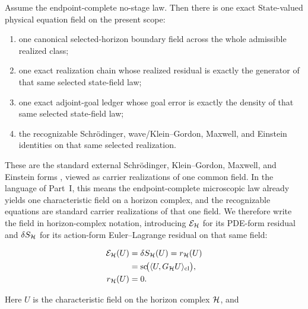 \begin{corollary}
\label{cor:endpoint-complete-no-stage-law-already-yields-one-exact-physical-equation-field}
Assume the endpoint-complete no-stage law. Then there is one exact
\(\mathrm{State}\)-valued physical equation field on the present scope:
\begin{enumerate}[label=(\roman*), leftmargin=2em, itemsep=0.2em]
\item one canonical selected-horizon boundary field across the whole
      admissible realized class;
\item one exact realization chain whose realized residual is
      exactly the generator of that same selected state-field law;
\item one exact adjoint-goal ledger whose goal error is exactly the density of
      that same selected state-field law;
\item the recognizable Schr\"odinger, wave/Klein--Gordon, Maxwell, and
      Einstein identities on that same selected realization.
\end{enumerate}
These are the standard external Schr\"odinger, Klein--Gordon, Maxwell, and
Einstein forms
\cite{Schrodinger1926,Klein1926,Maxwell1865,Einstein1915,Wald1984},
viewed as carrier realizations of one common field.
In the language of Part~I, this means the endpoint-complete microscopic
law already yields one characteristic field on a horizon complex, and the
recognizable equations are standard carrier realizations of that one field. We
therefore write the field in horizon-complex notation,
introducing \(\mathcal E_{\mathcal{H}}\) for its PDE-form residual and
\(\delta S_{\mathcal{H}}\) for its action-form Euler--Lagrange residual on
that same field:
\begin{tcolorbox}[colback=black!2, colframe=black!60, boxrule=0.8pt, title={Unified characteristic residual equation}]
\[
\begin{aligned}
\mathcal E_{\mathcal{H}}(U)
  &= \delta S_{\mathcal{H}}(U)
   = r_{\mathcal{H}}(U) \\
  &= \operatorname{sc}\!\bigl(\langle U,G_{\mathcal{H}}U\rangle_{\mathrm{cl}}\bigr),\\
r_{\mathcal{H}}(U) &= 0.
\end{aligned}
\]
\end{tcolorbox}
Here \(U\) is the characteristic field on the horizon complex \(\mathcal{H}\), and

\end{corollary}
